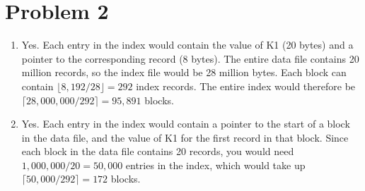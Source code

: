 \documentclass[a4paper, 12pt]{article}
\begin{document}
\section*{Problem 2}

\begin{enumerate}
	\item Yes. Each entry in the index would contain the value of K1 (20 bytes)
			and a pointer to the corresponding record (8 bytes). The entire data
			file contains 20 million records, so the index file would be 28
			million bytes. Each block can contain $\lfloor 8,192 / 28 \rfloor =
			292$ index records. The entire index would therefore be $\lceil
			28,000,000 / 292 \rceil = 95,891$ blocks.
	\item Yes. Each entry in the index would contain a pointer to the start of a
			block in the data file, and the value of K1 for the first record in
			that block. Since each block in the data file contains 20 records,
			you would need $1,000,000 / 20 = 50,000$ entries in the index, which
			would take up $\lceil 50,000 / 292 \rceil = 172$ blocks.
\end{enumerate}
\end{document}
